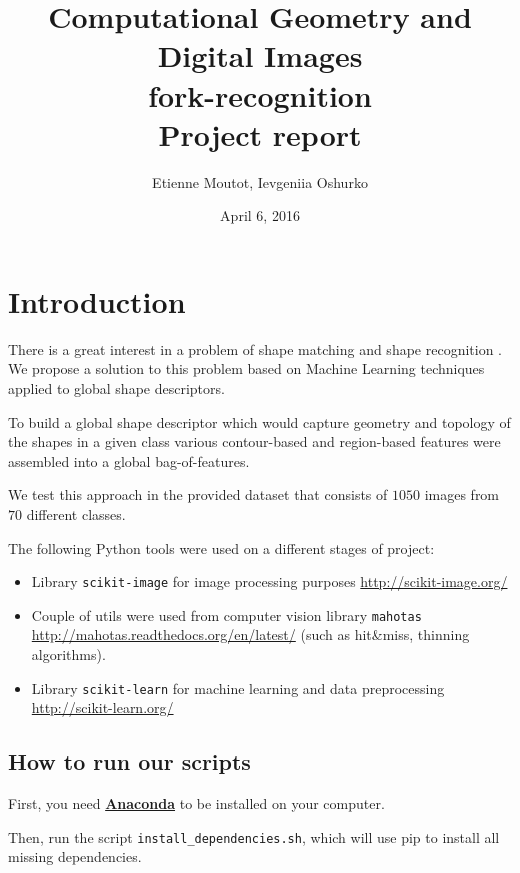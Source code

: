 \documentclass[12pt]{article}
\begin{document}
\title{
Computational Geometry and Digital Images \\
\textbf{fork-recognition}\\
Project report
}

\author{Etienne Moutot, Ievgeniia Oshurko}
\date{April 6, 2016}
\maketitle


\section{Introduction}  

There is a great interest in a problem of shape matching and shape recognition \cite{Zhang20041}. We propose a solution to this problem based on Machine Learning techniques applied to global shape descriptors.

To build a global shape descriptor which would capture geometry and topology of the shapes in a given class various contour-based and region-based features were assembled into a global bag-of-features.

We test this approach in the provided dataset that consists of $1 050$ images from $70$ different classes.

The following Python tools were used on a different stages of project:
\begin{itemize}
\item Library \texttt{scikit-image} for image processing purposes \url{http://scikit-image.org/}
\item Couple of utils were used from computer vision library \texttt{mahotas} \url{http://mahotas.readthedocs.org/en/latest/} (such as hit\&miss, thinning algorithms).
\item Library \texttt{scikit-learn} for machine learning and data preprocessing \url{http://scikit-learn.org/}
\end{itemize}

\subsection{How to run our scripts}

First, you need \href{https://www.continuum.io/downloads}{\textbf{Anaconda}} to be installed on your computer.

Then, run the script \texttt{install\_dependencies.sh}, which will use pip to install all missing dependencies.
\end{document}
